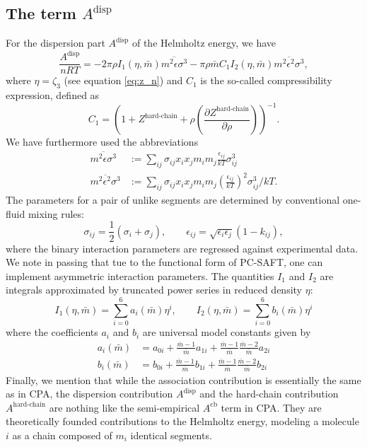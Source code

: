 \documentclass[english]{../thermomemo/thermomemo}
\newcommand*{\pder}[2]{\left(\frac{\partial #1}{\partial #2}\right)}
\newcommand{\lp}{\left(}
\newcommand{\rp}{\right)}
\begin{document}
\subsection{The term $A^{\text{disp}}$}
For the dispersion part $A^{\text{disp}}$ of the Helmholtz energy, we have
\begin{equation}
  \frac{A^{\text{disp}}}{nRT} = -2 \pi \rho I_1(\eta,\bar m) \overline{m^2 \epsilon \sigma^3} - \pi \rho \bar m C_1 I_2(\eta,\bar m) \overline{m^2 \epsilon^2 \sigma^3},
\end{equation}
where $\eta = \zeta_3$ (see equation \eqref{eq:z_n}) and $C_1$ is the so-called
compressibility expression, defined as
\begin{equation}
  C_1 = \lp 1+Z^{\text{hard-chain}} + \rho \pder{Z^{\text{hard-chain}}}{\rho} \rp^{-1}.
\end{equation}
We have furthermore used the abbreviations
\begin{align}
  \overline{m^2\epsilon \sigma^3} &:= \sum_{ij} \sigma_{ij} x_i x_j m_i m_j \frac{\epsilon_{ij}}{kT} \sigma_{ij}^3 \\
  \overline{m^2\epsilon^2\sigma^3} &:= \sum_{ij} \sigma_{ij} x_i x_j m_i m_j \lp \frac{\epsilon_{ij}}{kT} \rp^2 \sigma_{ij}^3/kT.
\end{align}
The parameters for a pair of unlike segments are determined by conventional
one-fluid mixing rules:
\begin{equation}
  \sigma_{ij} = \frac{1}{2}(\sigma_i + \sigma_j), \qquad  \epsilon_{ij} = \sqrt{\epsilon_i \epsilon_j} (1-k_{ij}),
\end{equation}
where the binary interaction parameters are regressed against experimental
data. We note in passing that tue to the functional form of PC-SAFT, one can
implement asymmetric interaction parameters. The quantities $I_1$ and $I_2$ are
integrals approximated by truncated power series in reduced density $\eta$:
\begin{equation}
  I_1(\eta,\bar m) = \sum_{i=0}^6 a_i(\bar m) \eta^i, \qquad  I_2(\eta,\bar m) = \sum_{i=0}^6 b_i(\bar m) \eta^i
\end{equation}
where the coefficients $a_i$ and $b_i$ are universal model constants given by
\begin{align}
  a_i(\bar m) &= a_{0i} + \frac{\bar m -1}{\bar m}a_{1i} + \frac{\bar m -1}{\bar m} \frac{\bar m -2}{\bar m}a_{2i} \\
  b_i(\bar m) &= b_{0i} + \frac{\bar m -1}{\bar m}b_{1i} + \frac{\bar m -1}{\bar m} \frac{\bar m -2}{\bar m}b_{2i}
\end{align}
Finally, we mention that while the association contribution is essentially the
same as in CPA, the dispersion contribution $A^{\text{disp}}$ and the hard-chain
contribution $A^{\text{hard-chain}}$ are nothing like the semi-empirical
$A^{\text{cb}}$ term in CPA. They are theoretically founded contributions to the
Helmholtz energy, modeling a molecule $i$ as a chain composed of $m_i$ identical
segments.
\end{document}
